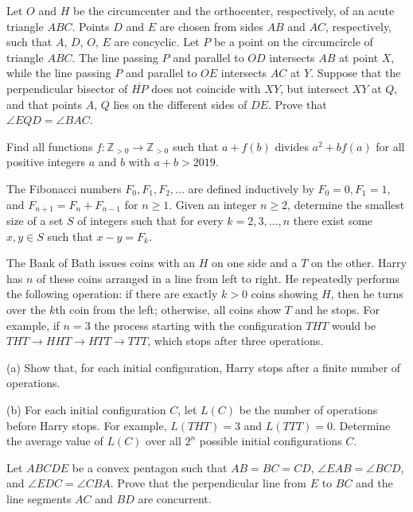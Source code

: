 \documentclass[11pt]{scrartcl}
\begin{document}
\begin{problem}[457324036151847]
Let $O$ and $H$ be the circumcenter and the orthocenter, respectively, of an acute triangle $ABC$. Points $D$ and $E$ are chosen from sides $AB$ and $AC$, respectively, such that $A$, $D$, $O$, $E$ are concyclic. Let $P$ be a point on the circumcircle of triangle $ABC$. The line passing $P$ and parallel to $OD$ intersects $AB$ at point $X$, while the line passing $P$ and parallel to $OE$ intersects $AC$ at $Y$. Suppose that the perpendicular bisector of $\overline{HP}$ does not coincide with $XY$, but intersect $XY$ at $Q$, and that points $A$, $Q$ lies on the different sides of $DE$. Prove that $\angle EQD = \angle BAC$.
\end{problem}
\begin{problem}[3435532350205377704]
Find all functions $f:\mathbb Z_{>0}\to \mathbb Z_{>0}$ such that $a+f(b)$ divides $a^2+bf(a)$ for all positive integers $a$ and $b$ with $a+b>2019$.
\end{problem}
\begin{problem}[6978535805224432571]
	The Fibonacci numbers $F_0, F_1, F_2, . . .$ are defined inductively by $F_0=0, F_1=1$, and $F_{n+1}=F_n+F_{n-1}$ for $n \ge 1$. Given an integer $n \ge 2$, determine the smallest size of a set $S$ of integers such that for every $k=2, 3, . . . , n$ there exist some $x, y \in S$ such that $x-y=F_k$.
\end{problem}
\begin{problem}[623590906176957]
	The Bank of Bath issues coins with an $H$ on one side and a $T$ on the other. Harry has $n$ of these coins arranged in a line from left to right. He repeatedly performs the following operation: if there are exactly $k>0$ coins showing $H$, then he turns over the $k$th coin from the left; otherwise, all coins show $T$ and he stops. For example, if $n=3$ the process starting with the configuration $THT$ would be $THT \to HHT  \to HTT \to TTT$, which stops after three operations.

(a) Show that, for each initial configuration, Harry stops after a finite number of operations.

(b) For each initial configuration $C$, let $L(C)$ be the number of operations before Harry stops. For example, $L(THT) = 3$ and $L(TTT) = 0$. Determine the average value of $L(C)$ over all $2^n$ possible initial configurations $C$.
\end{problem}
\begin{problem}[7997372712267182584]
Let $ABCDE$ be a convex pentagon such that $AB=BC=CD$, $\angle{EAB}=\angle{BCD}$, and $\angle{EDC}=\angle{CBA}$. Prove that the perpendicular line from $E$ to $BC$ and the line segments $AC$ and $BD$ are concurrent.
\end{problem}
\end{document}
